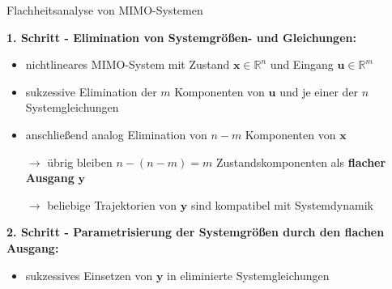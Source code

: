 \documentclass[
	ngerman,
	10pt,				%
	aspectratio=169, 	%
	xcolor=dvipsnames
]{beamer}
\begin{document}

\begin{frame}[t,fragile,label=Flachheit_2]{\large Flachheitsanalyse von MIMO-Systemen}
	
	\textbf{1. Schritt - Elimination von Systemgrößen- und Gleichungen:}
	\begin{itemize}
		\pause
		\item  nichtlineares MIMO-System mit Zustand $\mathbf{x} \in \mathbb{R}^n$ und Eingang $\mathbf{u} \in \mathbb{R}^m$
		\pause
		\item sukzessive Elimination der $m$ Komponenten von $\mathbf{u}$ und je einer der $n$ Systemgleichungen
		\pause
		\item anschließend analog Elimination von $n - m$ Komponenten von $\mathbf{x}$
		\pause
		\item[$\rightarrow$] übrig bleiben $n - (n - m) = m $ Zustandskomponenten als \textbf{flacher Ausgang} $\mathbf{y}$
		\pause
		\item[$\rightarrow$] beliebige Trajektorien von $\mathbf{y}$ sind kompatibel mit Systemdynamik
	\end{itemize}
	
	\bigskip
	\pause
	
	\textbf{2. Schritt - Parametrisierung der Systemgrößen durch den flachen Ausgang:}
	\begin{itemize}
		\pause
		\item sukzessives Einsetzen von $\mathbf{y}$ in eliminierte Systemgleichungen
	\end{itemize}
\end{frame}

\end{document}
